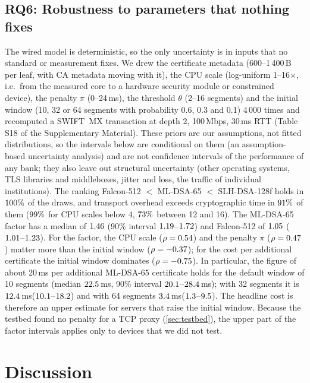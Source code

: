 \documentclass[preprint,12pt]{elsarticle}
\newcommand{\ms}{\,ms\xspace}
\newcommand{\supp}[1]{#1 of the Supplementary Material}
\begin{document}
\subsection{RQ6: Robustness to parameters that nothing fixes}
\label{sec:rq5}
The wired model is deterministic, so the only uncertainty is in inputs that no standard or measurement fixes. We drew the certificate metadata (600--1\,400\,B per leaf, with CA metadata moving with it), the CPU scale (log-uniform 1--16$\times$, i.e.\ from the measured core to a hardware security module or constrained device), the penalty $\pi$ (0--24\ms), the threshold $\theta$ (2--16 segments) and the initial window (10, 32 or 64 segments with probability 0.6, 0.3 and 0.1) 4\,000 times and recomputed a SWIFT~MX transaction at depth 2, 100\,Mbps, 30\ms RTT (\supp{Table S18}). These priors are our assumptions, not fitted distributions, so the intervals below are conditional on them (an assumption-based uncertainty analysis) and are not confidence intervals of the performance of any bank; they also leave out structural uncertainty (other operating systems, TLS libraries and middleboxes, jitter and loss, the traffic of individual institutions). The ranking Falcon-512 $<$ ML-DSA-65 $<$ SLH-DSA-128f holds in $100\%$ of the draws, and transport overhead exceeds cryptographic time in $91\%$ of them ($99\%$ for CPU scales below 4, $73\%$ between 12 and 16). The ML-DSA-65 factor has a median of $1.46$ (90\% interval $1.19$--$1.72$) and Falcon-512 of $1.05$ ($1.01$--$1.23$). For the factor, the CPU scale ($\rho=0.54$) and the penalty $\pi$ ($\rho=0.47$) matter more than the initial window ($\rho=-0.37$); for the cost per additional certificate the initial window dominates ($\rho=-0.75$). In particular, the figure of about 20\ms per additional ML-DSA-65 certificate holds for the default window of 10 segments (median $22.5$\ms, 90\% interval $20.1$--$28.4$\ms); with 32 segments it is $12.4$\ms ($10.1$--$18.2$) and with 64 segments $3.4$\ms ($1.3$--$9.5$). The headline cost is therefore an upper estimate for servers that raise the initial window. Because the testbed found no penalty for a TCP proxy (\cref{sec:testbed}), the upper part of the factor intervals applies only to devices that we did not test.

\section{Discussion}
\label{sec:discussion}
\end{document}
